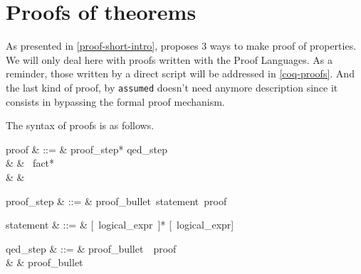
\section{Proofs of  theorems}
As presented in \ref{proof-short-intro}, {\focal} proposes 3 ways to
make proof of properties. We will only deal here with proofs written
with the {\focal} Proof Languages. As a reminder, those written by a
direct {\coq} script will be addressed in \ref{coq-proofs}. And the
last kind of proof, by {\tt assumed} doesn't need anymore description
since it consists in bypassing the formal proof mechanism.

The syntax of proofs is as follows.
\begin{syntax}
proof & ::=  & proof\_step* qed\_step \\
      & \mid & \ fact* \\
      & \mid & 
\end{syntax}

\begin{syntax}
proof\_step & ::=  & proof\_bullet\ statement\ proof
\end{syntax}

\begin{syntax}
statement & ::=  & [\ logical\_expr\ \terminal{,}]*
                   [\ logical\_expr]
\end{syntax}

\begin{syntax}
qed\_step & ::=  & proof\_bullet\ \ proof \\
          & \mid & proof\_bullet\ 
\end{syntax}

